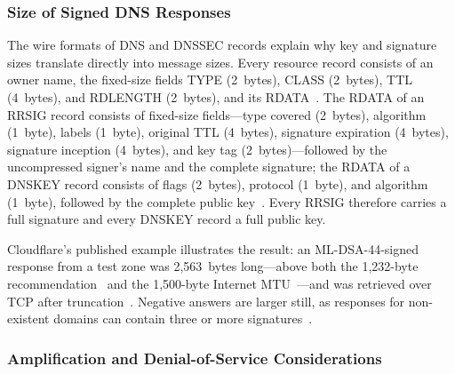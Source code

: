 \documentclass[conference]{IEEEtran}
\begin{document}
\subsubsection{Size of Signed DNS Responses}
\label{sec:respsize}

The wire formats of DNS and DNSSEC records explain why key and signature sizes
translate directly into message sizes. Every resource record consists of an
owner name, the fixed-size fields TYPE (2~bytes), CLASS (2~bytes), TTL
(4~bytes), and RDLENGTH (2~bytes), and its RDATA~\cite{rfc1035}. The RDATA of
an RRSIG record consists of fixed-size fields---type covered (2~bytes),
algorithm (1~byte), labels (1~byte), original TTL (4~bytes), signature
expiration (4~bytes), signature inception (4~bytes), and key tag
(2~bytes)---followed by the uncompressed signer's name and the complete
signature; the RDATA of a DNSKEY record consists of flags (2~bytes), protocol
(1~byte), and algorithm (1~byte), followed by the complete public
key~\cite{rfc4034}. Every RRSIG therefore carries a full signature and every
DNSKEY record a full public key.

Cloudflare's published example illustrates the result: an ML-DSA-44-signed
response from a test zone was 2,563~bytes long---above both the 1,232-byte
recommendation~\cite{rfc9715} and the 1,500-byte Internet
MTU~\cite{cloudflaremtu}---and was retrieved over TCP after
truncation~\cite{cloudflareblog}. Negative answers are larger still, as
responses for non-existent domains can contain three or more
signatures~\cite{retrofitting}.

\subsubsection{Amplification and Denial-of-Service Considerations}
\end{document}
